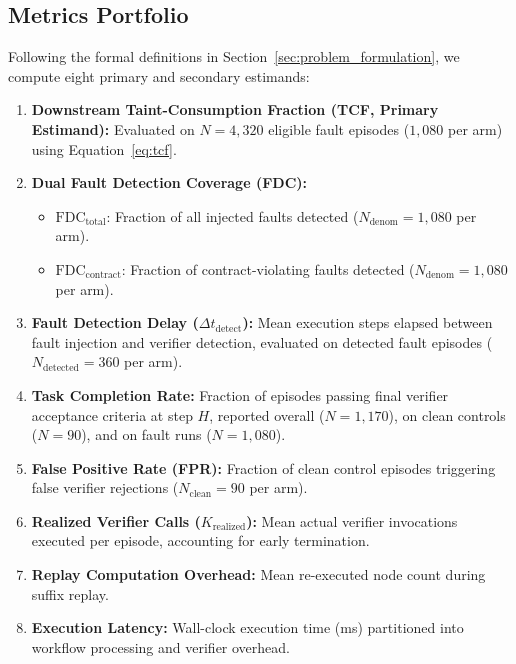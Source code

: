 \subsection{Metrics Portfolio}
Following the formal definitions in Section~\ref{sec:problem_formulation}, we compute eight primary and secondary estimands:
\begin{enumerate}
    \item \textbf{Downstream Taint-Consumption Fraction (TCF, Primary Estimand):} Evaluated on $N = 4,320$ eligible fault episodes ($1,080$ per arm) using Equation~\ref{eq:tcf}.
    \item \textbf{Dual Fault Detection Coverage (FDC):}
    \begin{itemize}
        \item $\text{FDC}_{\text{total}}$: Fraction of all injected faults detected ($N_{\text{denom}} = 1,080$ per arm).
        \item $\text{FDC}_{\text{contract}}$: Fraction of contract-violating faults detected ($N_{\text{denom}} = 1,080$ per arm).
    \end{itemize}
    \item \textbf{Fault Detection Delay ($\Delta t_{\text{detect}}$):} Mean execution steps elapsed between fault injection and verifier detection, evaluated on detected fault episodes ($N_{\text{detected}} = 360$ per arm).
    \item \textbf{Task Completion Rate:} Fraction of episodes passing final verifier acceptance criteria at step $H$, reported overall ($N=1,170$), on clean controls ($N=90$), and on fault runs ($N=1,080$).
    \item \textbf{False Positive Rate (FPR):} Fraction of clean control episodes triggering false verifier rejections ($N_{\text{clean}} = 90$ per arm).
    \item \textbf{Realized Verifier Calls ($K_{\text{realized}}$):} Mean actual verifier invocations executed per episode, accounting for early termination.
    \item \textbf{Replay Computation Overhead:} Mean re-executed node count during suffix replay.
    \item \textbf{Execution Latency:} Wall-clock execution time (ms) partitioned into workflow processing and verifier overhead.
\end{enumerate}

